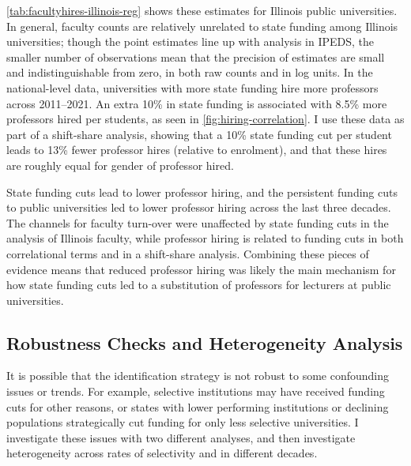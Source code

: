 \autoref{tab:facultyhires-illinois-reg} shows these estimates for Illinois public universities.
In general, faculty counts are relatively unrelated to state funding among Illinois universities; though the point estimates line up with analysis in IPEDS, the smaller number of observations mean that the precision of estimates are small and indistinguishable from zero, in both raw counts and in log units.
In the national-level \cite{wapman2022quantifying} data, universities with more state funding hire more professors across 2011--2021.
An extra 10\% in state funding is associated with 8.5\% more professors hired per students, as seen in \autoref{fig:hiring-correlation}.
I use these data as part of a shift-share analysis, showing that a 10\% state funding cut per student leads to 13\% fewer professor hires (relative to enrolment), and that these hires are roughly equal for gender of professor hired.

State funding cuts lead to lower professor hiring, and the persistent funding cuts to public universities led to lower professor hiring across the last three decades.
The channels for faculty turn-over were unaffected by state funding cuts in the analysis of Illinois faculty, while professor hiring is related to funding cuts in both correlational terms and in a shift-share analysis.
Combining these pieces of evidence means that reduced professor hiring was likely the main mechanism for how state funding cuts led to a substitution of professors for lecturers at public universities.

\subsection{Robustness Checks and Heterogeneity Analysis}
\label{sec:results-robustness}
It is possible that the identification strategy is not robust to some confounding issues or trends.
For example, selective institutions may have received funding cuts for other reasons, or states with lower performing institutions or declining populations strategically cut funding for only less selective universities.
I investigate these issues with two different analyses, and then investigate heterogeneity across rates of selectivity and in different decades.

